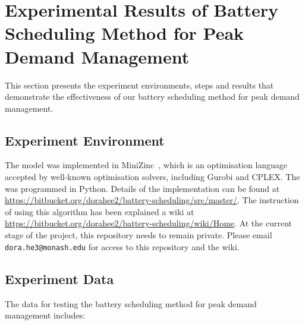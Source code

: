 %
%		
%		
%	




\section{Experimental Results of Battery Scheduling Method for Peak Demand Management}
\label{pdm:exp}

This section presents the experiment environments, steps and results that demonstrate the effectiveness of our battery scheduling method for peak demand management. 

\subsection{Experiment Environment}

The  model was implemented in MiniZinc~\cite{Stuckey2018}, which is an optimisation language accepted by well-known optimisation solvers, including Gurobi and CPLEX. The  was programmed in Python. Details of the implementation can be found at \url{https://bitbucket.org/dorahee2/battery-scheduling/src/master/}. The instruction of using this algorithm has been explained a wiki at \url{https://bitbucket.org/dorahee2/battery-scheduling/wiki/Home}. 
At the current stage of the project, this repository needs to remain private. Please email \texttt{dora.he3@monash.edu} for access to this repository and the wiki.

\subsection{Experiment Data}

The data for testing the battery scheduling method for peak demand management includes:

